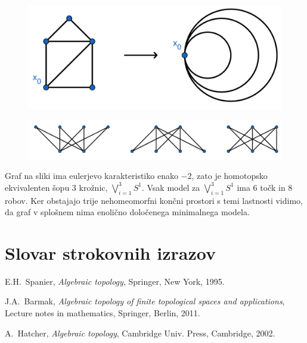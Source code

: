 \documentclass[mat1]{fmfdelo}
\DeclareRobustCommand{\h}{
    \mathcal{H}}
\DeclareRobustCommand{\pot}{
    $\h-$pot
}
\begin{document}
\begin{primer}
    \begin{figure}[h]
        \centering
        \includegraphics[width=0.55\linewidth]{v3.png}
    \end{figure}
    \begin{figure}[h]
        \centering
        \includegraphics[width=0.8\linewidth]{grafi.png}
    \end{figure}

    Graf na sliki ima eulerjevo karakteristiko enako $-2$, zato je homotopsko ekvivalenten šopu $3$ krožnic, $\bigvee\limits_{i=1}^{3}S^1$. Vsak model za $\bigvee\limits_{i=1}^{3}S^1$ ima $6$ točk in $8$ robov. Ker obstajajo trije nehomeomorfni končni prostori s temi lastnosti vidimo, da graf v splošnem nima enolično določenega minimalnega modela.
\end{primer}

\section*{Slovar strokovnih izrazov}


\geslo{$\h-$path}{\pot}


\begin{thebibliography}{99}

E.H.~Spanier, \emph{Algebraic topology}, Springer, New York, 1995.

J.A.~Barmak, \emph{Algebraic topology of finite topological spaces and applications}, Lecture notes in mathematics, Springer, Berlin, 2011.

A.~Hatcher, \emph{Algebraic topology}, Cambridge Univ. Press, Cambridge, 2002.



\end{thebibliography}
\end{document}
